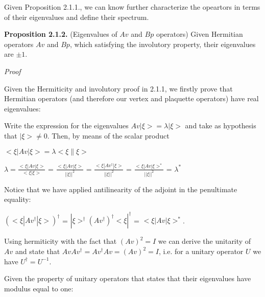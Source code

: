 \documentclass[12pt]{report}
\begin{document}
	
	\begin{minipage}{1\textwidth}
		
		
		Given Proposition 2.1.1., we can know further characterize the opeartors in terms of their eigenvalues and define their spectrum.	\newline
		
		\textbf{Proposition 2.1.2.} (Eigenvalues of $Av$ and $Bp$ operators) Given Hermitian operators $Av$ and $Bp$, which satisfying the involutory property, their eigenvalues are $\pm 1$.
		\newline
		
		\textit{Proof}\newline
		
		Given the Hermiticity and involutory proof in 2.1.1, we firstly prove that Hermitian operators (and therefore our vertex and plaquette operators) have real eigenvalues: \newline
		
		Write the expression for the eigenvalues $Av |\xi> = \lambda |\xi>$ and take as hypothesis that $|\xi> \neq 0$. Then, by means of the scalar product\newline
		
		\begin{center}
			$<\xi|Av|\xi> = \lambda <\xi \| \xi>$\newline
			
			$\lambda = \frac {<\xi|Av|\xi>}{<\xi |\xi>}$ = $\frac {<\xi|Av|\xi>}{||\xi||^2}$ = $\frac {<\xi|Av^{\dagger}|\xi>}{||\xi||^2}$ = $\frac {<\xi|Av|\xi>^*}{||\xi||^2}$ = $\lambda^*$\newline
		\end{center}
		
		Notice that we have applied antilinearity of the adjoint in the penultimate equality: \newline
		
		\begin{center}
			$(<\xi|Av^{\dagger}|\xi>)^{\dagger}$ = $|\xi>^{\dagger} (Av^{\dagger})^{\dagger} <\xi|^{\dagger}$ = $<\xi|Av|\xi>^*$. \newline
		\end{center}
		
		Using hermiticity with the fact that $(Av)^2=I$ we can derive the unitarity of $Av$ and state that $Av Av^{\dagger} = Av^{\dagger} Av = (Av)^2 = I$, i.e. for a unitary operator $U$ we have $U^{\dagger}=U^{-1}$. \newline
		
		Given the property of unitary operators that states that their eigenvalues have modulus equal to one:\newline 
		

\end{minipage}
\end{document}

